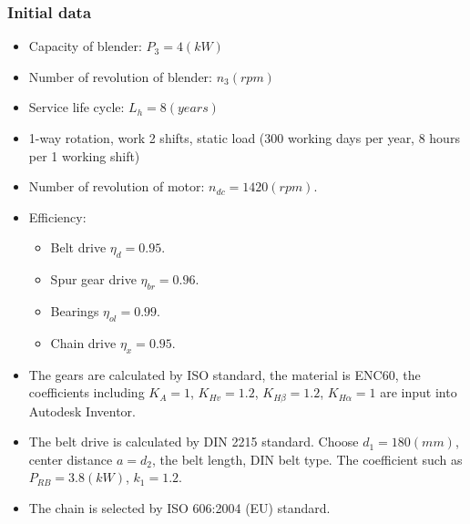 \subsubsection{Initial data}
\begin{itemize}
	\item Capacity of blender: $ P_3 = 4\unit{(kW)} $
	\item Number of revolution of blender:  $ n_3 \unit{(rpm)} $
	\item Service life cycle: $ L_h = 8\unit{(years)} $
	\item 1-way rotation, work 2 shifts, static load (300 working days per year, 8 hours per 1 working shift)
	\item Number of revolution of motor: $ n_{dc} =1420 \unit{(rpm)}$.
	\item Efficiency:
	\begin{itemize}
		\item Belt drive $ \eta_d = 0.95 $.
		\item Spur gear drive $ \eta_{br} = 0.96 $.
		\item Bearings $ \eta_{ol} = 0.99 $.
		\item Chain drive $ \eta_x = 0.95 $.
	\end{itemize}
\item The gears are calculated by ISO standard, the material is ENC60, the coefficients including $ K_A = 1 $, $ K_{Hv} = 1.2 $, $ K_{H\beta} = 1.2 $, $ K_{H\alpha} = 1 $ are input into Autodesk Inventor.
\item The belt drive is calculated by DIN 2215 standard. Choose $ d_1 = 180\unit{(mm)} $, center distance $ a = d_2 $, the belt length, DIN belt type. The coefficient such as $ P_{RB} = 3.8\unit{(kW)} $, $ k_1 = 1.2 $.
\item The chain is selected by ISO 606:2004 (EU) standard.
\end{itemize}
